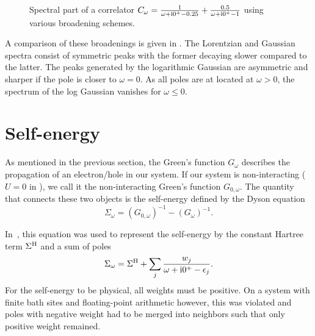 \begin{figure}[ht]
    \centering
    
    \caption{
        Spectral part of a correlator
        $C_\omega = \frac{1}{\omega + \mathrm{i}0^+ - 0.25} + \frac{0.5}{\omega + \mathrm{i}0^+ - 1}$
        using various broadening schemes.
    }%
    \label{fig:broadening}
\end{figure}

A comparison of these broadenings is given in .
The Lorentzian and Gaussian spectra consist of symmetric peaks
with the former decaying slower compared to the latter.
The peaks generated by the logarithmic Gaussian are asymmetric
and sharper if the pole is closer to $\omega=0$.
As all poles are at located at $\omega>0$,
the spectrum of the log Gaussian vanishes for $\omega\le0$.

\section{Self-energy}%
\label{sec:self-energy}

As mentioned in the previous section,
the Green's function $G_\omega$ describes the propagation of an electron/hole in our system.
If our system is non-interacting ($U=0$ in ),
we call it the non-interacting Green's function $G_{0, \omega}$.
The quantity that connects these two objects is the self-energy defined by the Dyson equation
\begin{equation}
    \Sigma_\omega = (G_{0, \omega})^{-1} - (G_\omega)^{-1}.
    \label{eq:dyson}
\end{equation}

In~\cite{Lu2014},
this equation was used to represent the self-energy by the constant Hartree term $\Sigma^{\mathrm{H}}$
and a sum of poles
\begin{equation}
    \Sigma_\omega = \Sigma^{\mathrm{H}} + \sum_j \frac{w_j}{\omega + \mathrm{i}0^+ - \epsilon_j}.
    \label{eq:self-energy-sum-of-poles}
\end{equation}
For the self-energy to be physical, all weights must be positive.
On a system with finite bath sites and floating-point arithmetic however,
this was violated and poles with negative weight had to be merged into neighbors
such that only positive weight remained.

